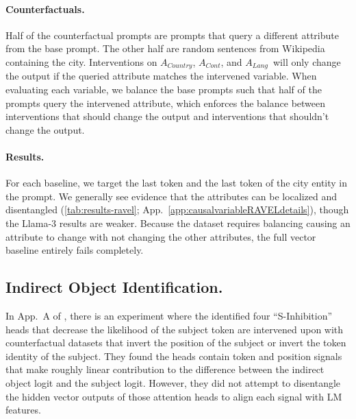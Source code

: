 \documentclass{article}
\theoremstyle{plain}
\theoremstyle{definition}
\theoremstyle{remark}
\newcommand{\continent}{$A_{\mathit{Cont}}$}
\newcommand{\country}{$A_{\mathit{Country}}$}
\newcommand{\lang}{$A_{\mathit{Lang}}$}
\begin{document}
\paragraph{Counterfactuals.} Half of the counterfactual prompts are prompts that query a different attribute from the base prompt. The other half are random sentences from Wikipedia containing the city. Interventions on \country, \continent, and \lang\ will only change the output if the queried attribute matches the intervened variable.
When evaluating each variable, we balance the base prompts such that half of the prompts query the intervened attribute, which enforces the balance between interventions that should change the output and interventions that shouldn't change the output.

\paragraph{Results.} For each baseline, we target the last token and the last token of the city entity in the prompt. We generally see evidence that the attributes can be localized and disentangled (\cref{tab:results-ravel}; App.~\ref{app:causalvariableRAVELdetails}), though the Llama-3 results are weaker. Because the dataset requires balancing causing an attribute to change with not changing the other attributes, the full vector baseline entirely fails completely. 

\subsection{Indirect Object Identification.}\label{sec:causal_variable_ioi}
In App.~A of \citet{wang2022interpretability}, there is an experiment where the identified four ``S-Inhibition'' heads that decrease the likelihood of the subject token are intervened upon with counterfactual datasets that invert the position of the subject or invert the token identity of the subject. They found the heads contain token and position signals that make roughly linear contribution to the difference between the indirect object logit and the subject logit. However, they did not attempt to disentangle the hidden vector outputs of those attention heads to align each signal with LM features. 
\end{document}
